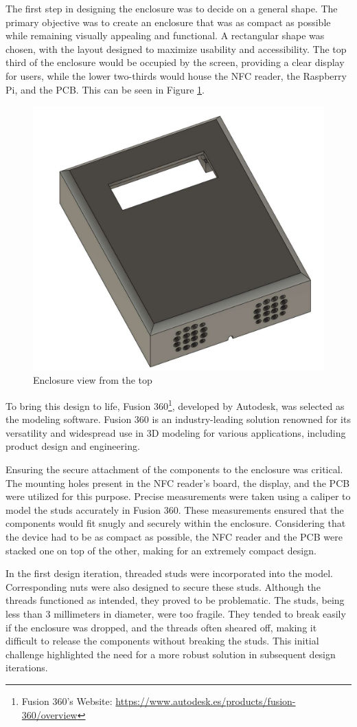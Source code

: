 The first step in designing the enclosure was to decide on a general shape. The primary objective 
was to create an enclosure that was as compact as possible while remaining visually appealing and 
functional. A rectangular shape was chosen, with the layout designed to maximize usability and 
accessibility. The top third of the enclosure would be occupied by the screen, providing a clear 
display for users, while the lower two-thirds would house the NFC reader, the Raspberry Pi, and 
the PCB. This can be seen in Figure \ref{fig:enclosure_front}.

\begin{figure}[h]
	\centering
	\includegraphics[width = .5\textwidth]{Imagenes/Vectorial/enclosure_front.pdf}
	\caption{Enclosure view from the top}
	\label{fig:enclosure_front}
\end{figure}

To bring this design to life, Fusion 360\footnote{Fusion 360's Website: 
\url{https://www.autodesk.es/products/fusion-360/overview}}, developed by Autodesk, was selected 
as the modeling software. Fusion 360 is an industry-leading solution renowned for its versatility 
and widespread use in 3D modeling for various applications, including product design and 
engineering.

Ensuring the secure attachment of the components to the enclosure was critical. The mounting holes 
present in the NFC reader's board, the display, and the PCB were utilized for this purpose. 
Precise measurements were taken using a caliper to model the studs accurately in Fusion 360. These 
measurements ensured that the components would fit snugly and securely within the enclosure.
Considering that the device had to be as compact as possible, the NFC reader and the PCB were 
stacked one on top of the other, making for an extremely compact design.

In the first design iteration, threaded studs were incorporated into the model. Corresponding nuts 
were also designed to secure these studs. Although the threads functioned as intended, they proved 
to be problematic. The studs, being less than 3 millimeters in diameter, were too fragile. They 
tended to break easily if the enclosure was dropped, and the threads often sheared off, making it 
difficult to release the components without breaking the studs. This initial challenge highlighted 
the need for a more robust solution in subsequent design iterations.

